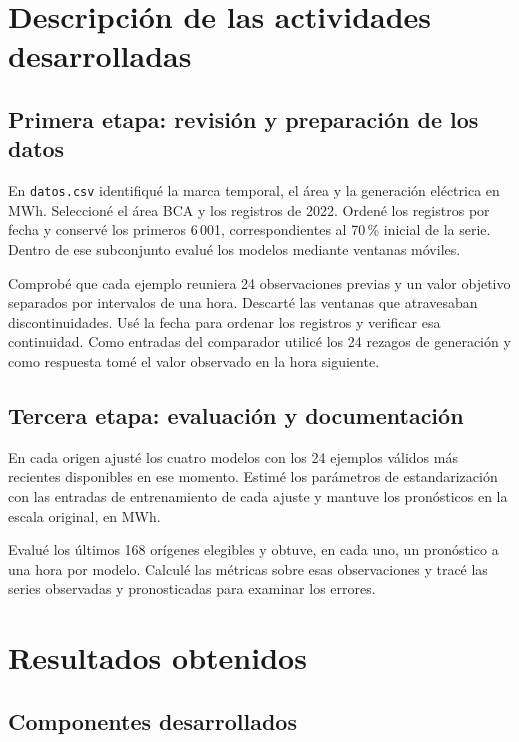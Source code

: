 \documentclass[11pt,letterpaper]{article}
\begin{document}
\section{Descripción de las actividades desarrolladas}

\subsection{Primera etapa: revisión y preparación de los datos}

En \texttt{datos.csv} identifiqué la marca temporal, el área y la generación eléctrica en MWh. Seleccioné el área BCA y los registros de 2022. Ordené los registros por fecha y conservé los primeros 6\,001, correspondientes al 70\,\% inicial de la serie. Dentro de ese subconjunto evalué los modelos mediante ventanas móviles.

Comprobé que cada ejemplo reuniera 24 observaciones previas y un valor objetivo separados por intervalos de una hora. Descarté las ventanas que atravesaban discontinuidades. Usé la fecha para ordenar los registros y verificar esa continuidad. Como entradas del comparador utilicé los 24 rezagos de generación y como respuesta tomé el valor observado en la hora siguiente.



\subsection{Tercera etapa: evaluación y documentación}

En cada origen ajusté los cuatro modelos con los 24 ejemplos válidos más recientes disponibles en ese momento. Estimé los parámetros de estandarización con las entradas de entrenamiento de cada ajuste y mantuve los pronósticos en la escala original, en MWh.

Evalué los últimos 168 orígenes elegibles y obtuve, en cada uno, un pronóstico a una hora por modelo. Calculé las métricas sobre esas observaciones y tracé las series observadas y pronosticadas para examinar los errores.

\section{Resultados obtenidos}

\subsection{Componentes desarrollados}
\end{document}
